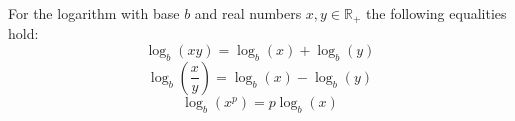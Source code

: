 For the logarithm with base $b$ and real numbers $x,y \in \mathbb{R}_+$ the following equalities hold: 
$$\log_b(x y) = \log_b(x) + \log_b(y)$$ %
$$\log_b(\frac{x}{y}) = \log_b(x) - \log_b(y)$$ %
$$\log_b(x^p) = p \log_b(x)$$ %
